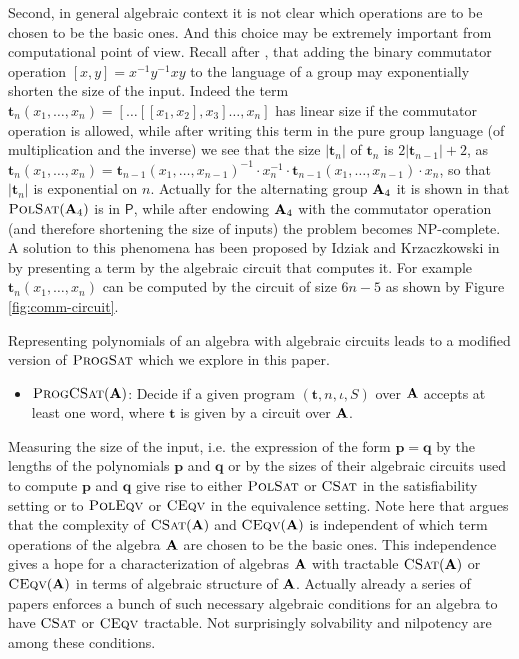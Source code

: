 \documentclass[11pt,a4paper]{amsart}
\newcommand{\polsat}[1]{\textsc{PolSat}\left( {\m #1} \right)}
\newcommand{\npc}{\textsf{NP}-complete\xspace}
\newcommand{\ptime}{\textsf{P}\xspace}
\newcommand{\m}[1]{{\uppercase {\bf{#1}}}}
\newcommand{\card}[1]{\left| #1 \right|}
\newcommand{\po}[1]{{\mathbf {#1}}}
\newcommand{\gProblem}[2]{\ensuremath{\operatorname{\textup{\textsc{{#2}}}}
		\ifthenelse{\equal{#1}{}}{}{\!\left( {#1} \right)}}}
\renewcommand{\polsat}[1]{\gProblem{#1}{PolSat}}
\newcommand{\poleqv}[1]{\gProblem{#1}{PolEqv}}
\newcommand{\ceqv}[1]{\gProblem{#1}{CEqv}}
\newcommand{\csat}[1]{\gProblem{#1}{CSat}}
\newcommand{\progpolsat}[1]{\gProblem{#1}{ProgSat}}
\newcommand{\progcsat}[1]{\gProblem{#1}{ProgCSat}}
\begin{document}
Second, in general algebraic context it is not clear which operations are to be chosen to be the basic ones.
And this choice may be extremely important from computational point of view.
Recall after \cite{IdziakK22}, that adding the binary commutator operation 
$[x,y]=x^{-1}y^{-1}xy$ to the language of a group may exponentially shorten the size of the input.
Indeed the term $\po t_n(x_1,\ldots,x_n) =[\ldots [[x_1,x_2],x_3] \ldots, x_n]$ has linear size if the commutator operation is allowed, while after writing this term in the pure group language (of multiplication and the inverse) we see that the size $\card{\po t_n}$ of $\po t_n$ is 
$2\card{\po t_{n-1}}+2$, as 
$\po t_n(x_1,\ldots,x_n)=
\po t_{n-1}(x_1,\ldots,x_{n-1})^{-1}\cdot x_n^{-1}\cdot\po t_{n-1}(x_1,\ldots,x_{n-1})\cdot x_n$, 
so that $\card{\po t_n}$ is exponential on $n$.
Actually for the alternating group $\m A_4$ it is shown in \cite{HorvathS12} that 
$\polsat{\m A_4}$ is in $\ptime$, while after endowing $\m A_4$ with the commutator operation 
(and therefore shortening the size of inputs) the problem becomes \npc.
A solution to this phenomena has been proposed by Idziak and Krzaczkowski in \cite{IdziakK22} by presenting a term by the algebraic circuit that computes it. 
For example $\po t_n(x_1,\ldots,x_n)$ can be computed by the circuit of size $6n-5$ as shown by Figure \ref{fig:comm-circuit}.

\medskip\noindent
Representing polynomials of an algebra with algebraic circuits leads to a modified version of \progpolsat{} which we explore in this paper.
\begin{itemize}
  \item[]$\progcsat{\m A}$: \quad
        Decide if a given program $(\po t, n, \iota, S)$  over $\m A$ accepts at least one word, where $\po t$ is
        given by a circuit over $\m A$. 
\end{itemize}

Measuring the size of the input, i.e. the expression of the form $\po p=\po q$ by the lengths of the polynomials $\po p$ and $\po q$ or by the sizes of their algebraic circuits used to compute $\po p$ and $\po q$ give rise to either \polsat{} or \csat{} in the satisfiability setting 
or to \poleqv{} or \ceqv{} in the equivalence setting.
Note here that \cite{IdziakK22} argues that the complexity of $\csat{\m A}$ and $\ceqv{\m A}$ is independent of which term operations of the algebra $\m A$ are chosen to be the basic ones.
This independence gives a hope for a characterization of algebras $\m A$ with tractable 
$\csat{\m A}$ or $\ceqv{\m A}$ in terms of algebraic structure of $\m A$. 
Actually already a series of papers 
\cite{IdziakKK20,Weiss20, IdziakKK22STACS,IdziakKKW22-icalp,IdziakK22,Kompatscher21} 
enforces a bunch of such necessary algebraic conditions for an algebra to have \csat{} or \ceqv{} tractable.
Not surprisingly solvability and nilpotency are among these conditions.
\end{document}
